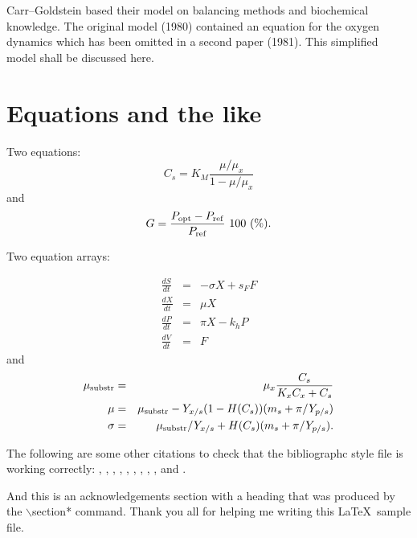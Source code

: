 \documentclass[ba]{imsart}
\numberwithin{equation}{section}
\theoremstyle{plain}
\begin{document}
Carr--Goldstein based their model on balancing methods and biochemical
know\-ledge. The original model (1980) contained an equation for the
oxygen dynamics which has been omitted in a second paper (1981). This
simplified model shall be discussed here.

\section{Equations and the like}

Two equations:
\begin{equation}
    C_{s}  =  K_{M} \frac{\mu/\mu_{x}}{1-\mu/\mu_{x}} \label{ccs}
\end{equation}
and
\begin{equation}
    G = \frac{P_{\rm opt} - P_{\rm ref}}{P_{\rm ref}} \mbox{\ }100 \mbox{\ }(\%).
\end{equation}

Two equation arrays:

\begin{eqnarray}
  \frac{dS}{dt} & = & - \sigma X + s_{F} F\\
  \frac{dX}{dt} & = &   \mu    X\\
  \frac{dP}{dt} & = &   \pi    X - k_{h} P\\
  \frac{dV}{dt} & = &   F
\end{eqnarray}
and
\begin{eqnarray}
 \mu_{\rm substr} & = & \mu_{x} \frac{C_{s}}{K_{x}C_{x}+C_{s}}  \\
 \mu              & = & \mu_{\rm substr} - Y_{x/s}(1-H(C_{s}))(m_{s}+\pi /Y_{p/s}) \\
 \sigma           & = & \mu_{\rm substr}/Y_{x/s}+ H(C_{s}) (m_{s}+ \pi /Y_{p/s}).
\end{eqnarray}


\begin{supplement}
\end{supplement}
\begin{supplement}
\end{supplement}

The following are some other citations to check that the bibliographc style
file is working correctly: \citet{akaike}, \citet*{akivarsq}, \citet{dyke},
\citet{greene}, \citet*{kstuart}, \citet{hilbetech}, \citet{hilbe},
\citet{hilbeglm}, \citet{maddalacntrsq}, and \citet*{companion}.  





\begin{acknowledgement}
And this is an acknowledgements section with a heading that was produced by the
$\backslash$section* command. Thank you all for helping me writing this
\LaTeX\ sample file.
\end{acknowledgement}
\end{document}
